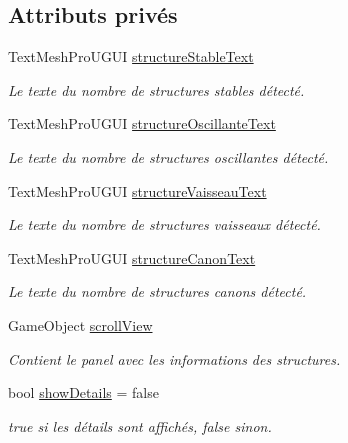 \subsection*{Attributs privés}
\begin{DoxyCompactItemize}
\item 
Text\+Mesh\+Pro\+U\+G\+UI \mbox{\hyperlink{class_detection_u_i_a16ce4f02d6d9598599cab4fd3a02fdce}{structure\+Stable\+Text}}
\begin{DoxyCompactList}\small\item\em Le texte du nombre de structures stables détecté. \end{DoxyCompactList}\item 
Text\+Mesh\+Pro\+U\+G\+UI \mbox{\hyperlink{class_detection_u_i_a0b27dc44d3ce8b0e9396e02644453301}{structure\+Oscillante\+Text}}
\begin{DoxyCompactList}\small\item\em Le texte du nombre de structures oscillantes détecté. \end{DoxyCompactList}\item 
Text\+Mesh\+Pro\+U\+G\+UI \mbox{\hyperlink{class_detection_u_i_ab98e67e9d4cadacbab30fe67ecc205f0}{structure\+Vaisseau\+Text}}
\begin{DoxyCompactList}\small\item\em Le texte du nombre de structures vaisseaux détecté. \end{DoxyCompactList}\item 
Text\+Mesh\+Pro\+U\+G\+UI \mbox{\hyperlink{class_detection_u_i_a23006d93a6dde4bef4932b37adc311c2}{structure\+Canon\+Text}}
\begin{DoxyCompactList}\small\item\em Le texte du nombre de structures canons détecté. \end{DoxyCompactList}\item 
Game\+Object \mbox{\hyperlink{class_detection_u_i_a25d50cd80e97c7a1d66453abea97852c}{scroll\+View}}
\begin{DoxyCompactList}\small\item\em Contient le panel avec les informations des structures. \end{DoxyCompactList}\item 
bool \mbox{\hyperlink{class_detection_u_i_aa81ac0779bb41b0299e6197d01f06cd4}{show\+Details}} = false
\begin{DoxyCompactList}\small\item\em true si les détails sont affichés, false sinon. \end{DoxyCompactList}\end{DoxyCompactItemize}


